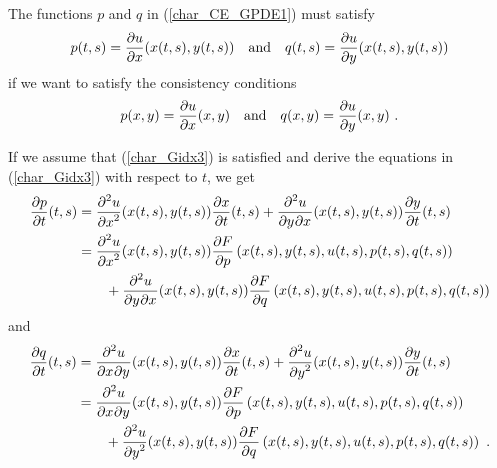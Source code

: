 The functions $p$ and $q$ in (\ref{char_CE_GPDE1}) must satisfy
\begin{equation} \label{char_Gidx3}
p(t,s) = \frac{\partial{u}}{\partial x}(x(t,s),y(t,s)) \quad \text{and} \quad
q(t,s) = \frac{\partial{u}}{\partial y}(x(t,s),y(t,s))
\end{equation}
if we want to satisfy the consistency conditions
\[
p(x,y) = \pdydx{u}{x}(x,y) \quad \text{and} \quad q(x,y) = \pdydx{u}{y}(x,y) \ .
\]

If we assume that (\ref{char_Gidx3}) is satisfied and derive the
equations in (\ref{char_Gidx3}) with respect to $t$, we get
\begin{align}
\pdydx{p}{t}(t,s) &= \pdydxn{u}{x}{2}(x(t,s),y(t,s)) \pdydx{x}{t}(t,s)
+ \pdydxnm{u}{y}{x}{2}{}{}(x(t,s),y(t,s)) \pdydx{y}{t}(t,s) \nonumber \\
&= \pdydxn{u}{x}{2}(x(t,s),y(t,s))
\pdydx{F}{p}\left(x(t,s),y(t,s),u(t,s),p(t,s),q(t,s)\right) \nonumber \\
& \qquad + \pdydxnm{u}{y}{x}{2}{}{}(x(t,s),y(t,s))
\pdydx{F}{q}\left(x(t,s),y(t,s),u(t,s),p(t,s),q(t,s)\right)
\label{char_Gidx1}
\end{align}
and
\begin{align}
\pdydx{q}{t}(t,s) &= \pdydxnm{u}{x}{y}{2}{}{}(x(t,s),y(t,s)) \pdydx{x}{t}(t,s)
+ \pdydxn{u}{y}{2}(x(t,s),y(t,s)) \pdydx{y}{t}(t,s) \nonumber \\
&= \pdydxnm{u}{x}{y}{2}{}{}(x(t,s),y(t,s))
\pdydx{F}{p}\left(x(t,s),y(t,s),u(t,s),p(t,s),q(t,s)\right) \nonumber \\
& \qquad + \pdydxn{u}{y}{2}(x(t,s),y(t,s))
\pdydx{F}{q}\left(x(t,s),y(t,s),u(t,s),p(t,s),q(t,s)\right) \ .
\label{char_Gidx2}
\end{align}

